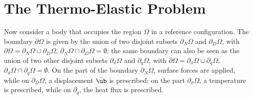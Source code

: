 \section{The Thermo-Elastic Problem}
Now consider a body that occupies the region $\Omega$ in a reference configuration. 
The boundary $\partial\Omega$ is given by the union of two disjoint subsets $\partial_N\Omega$ and $\partial_D\Omega$, with $\partial\Omega = \partial_N\Omega \cup \partial_D\Omega$, $\partial_N\Omega \cap \partial_D\Omega = \emptyset$; the same boundary can also be seen as the union of two other disjoint subsets $\partial_\vartheta\Omega$ and $\partial_q\Omega$, with 
$\partial\Omega = \partial_\vartheta\Omega \cup \partial_q\Omega$, $\partial_\vartheta\Omega \cap \partial_q\Omega = \emptyset$.
On the part of the boundary $\partial_N\Omega$, surface forces are applied, while on $\partial_D\Omega$, a displacement $\bar{\ub}$ is prescribed; on the part $\partial_\vartheta\Omega$, a temperature is prescribed, while on $\partial_q$, the heat flux is prescribed. 

